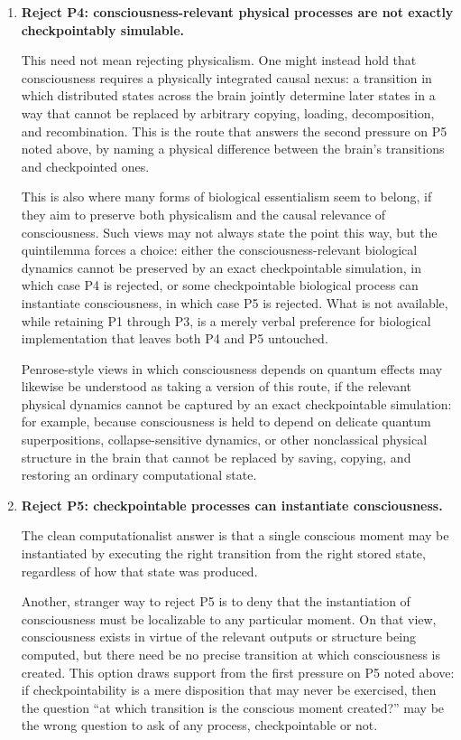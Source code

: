 \documentclass[11pt]{article}
\begin{document}
\begin{enumerate}[label=\textbf{\arabic*.}]
  \item \textbf{Reject P4: consciousness-relevant physical processes are not
          exactly checkpointably simulable.}

        This need not mean rejecting physicalism. One might instead hold that
        consciousness requires a physically integrated causal nexus: a
        transition in which distributed states across the brain jointly
        determine later states in a way that cannot be replaced by arbitrary
        copying, loading, decomposition, and recombination. This is the route
        that answers the second pressure on P5 noted above, by naming a
        physical difference between the brain's transitions and checkpointed
        ones.

        This is also where many forms of biological essentialism seem to
        belong, if they aim to preserve both physicalism and the causal
        relevance of consciousness. Such views may not always state the point
        this way, but the quintilemma forces a choice: either the
        consciousness-relevant biological dynamics cannot be preserved by an
        exact checkpointable simulation, in which case P4 is rejected, or some
        checkpointable biological process can instantiate consciousness, in
        which case P5 is rejected. What is not available, while retaining P1
        through P3, is a merely verbal preference for biological
        implementation that leaves both P4 and P5 untouched.

        Penrose-style views in which consciousness depends on quantum effects
        \cite{penrose1994} may likewise be understood as taking a version of
        this route, if the relevant physical dynamics cannot be captured by an
        exact checkpointable simulation: for example, because consciousness is
        held to depend on delicate quantum superpositions, collapse-sensitive
        dynamics, or other nonclassical physical structure in the brain that
        cannot be replaced by saving, copying, and restoring an ordinary
        computational state.

  \item \textbf{Reject P5: checkpointable processes can instantiate
          consciousness.}

        The clean computationalist answer is that a single conscious moment may
        be instantiated by executing the right transition from the right stored
        state, regardless of how that state was produced.

        Another, stranger way to reject P5 is to deny that the instantiation of
        consciousness must be localizable to any particular moment. On that
        view, consciousness exists in virtue of the relevant outputs or
        structure being computed, but there need be no precise transition at
        which consciousness is created. This option draws support from the
        first pressure on P5 noted above: if checkpointability is a mere
        disposition that may never be exercised, then the question ``at which
        transition is the conscious moment created?'' may be the wrong question
        to ask of any process, checkpointable or not.
\end{enumerate}
\end{document}
